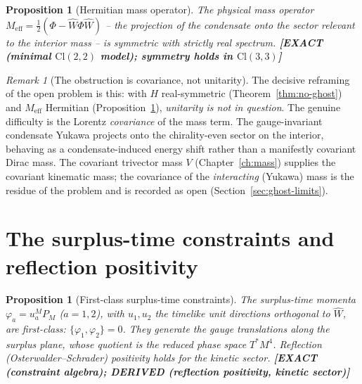 \documentclass[11pt,oneside]{book}
\newcommand{\Wh}{\hat{W}}                         %
\newcommand{\Cl}{\mathrm{Cl}}                     %
\newcommand{\status}[1]{{\sffamily\bfseries\color{statuscol}[#1]}}
\theoremstyle{plain}
\newtheorem{proposition}[theorem]{Proposition}
\theoremstyle{definition}
\theoremstyle{remark}
\newtheorem{remark}[theorem]{Remark}
\begin{document}
\begin{proposition}[Hermitian mass operator]
\label{prop:meff}
The physical mass operator $M_{\mathrm{eff}}=\tfrac12(\Phi-\Wh\Phi\Wh)$ -- the
projection of the condensate onto the sector relevant to the interior mass -- is
symmetric with strictly real spectrum. \status{EXACT (minimal $\Cl(2,2)$ model);
symmetry holds in $\Cl(3,3)$}
\end{proposition}

\begin{remark}[The obstruction is covariance, not unitarity]
\label{rem:true-obstruction}
The decisive reframing of the open problem is this: with $H$ real-symmetric
(Theorem~\ref{thm:no-ghost}) and $M_{\mathrm{eff}}$ Hermitian
(Proposition~\ref{prop:meff}), \emph{unitarity is not in question}. The genuine
difficulty is the Lorentz \emph{covariance} of the mass term. The gauge-invariant
condensate Yukawa projects onto the chirality-even sector on the interior, behaving
as a condensate-induced energy shift rather than a manifestly covariant Dirac mass.
The covariant trivector mass $V$ (Chapter~\ref{ch:mass}) supplies the covariant
kinematic mass; the covariance of the \emph{interacting} (Yukawa) mass is the
residue of the problem and is recorded as open (Section~\ref{sec:ghost-limits}).
\end{remark}

\section{The surplus-time constraints and reflection positivity}
\label{sec:constraints-rp}

\begin{proposition}[First-class surplus-time constraints]
\label{prop:firstclass}
The surplus-time momenta $\varphi_a=u_a^MP_M$ ($a=1,2$), with $u_1,u_2$ the timelike
unit directions orthogonal to $\Wh$, are first-class: $\{\varphi_1,\varphi_2\}=0$.
They generate the gauge translations along the surplus plane, whose quotient is the
reduced phase space $T^*M^4$. Reflection (Osterwalder--Schrader) positivity
\cite{OsterwalderSchrader1973,GlimmJaffe1987} holds for the kinetic sector.
\status{EXACT (constraint algebra); DERIVED (reflection positivity, kinetic sector)}
\end{proposition}
\end{document}
